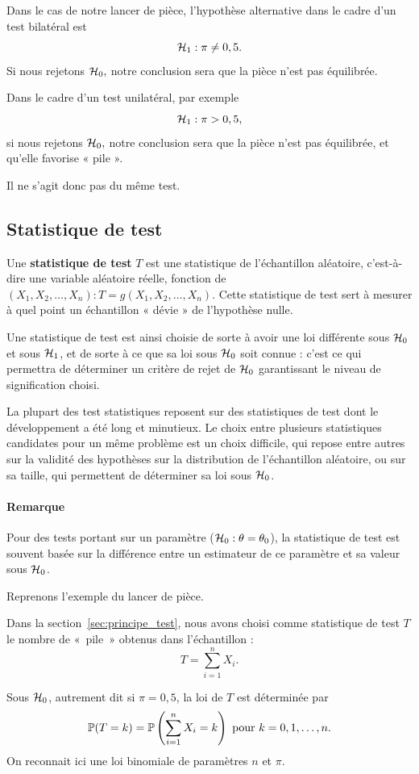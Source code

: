 \begin{exemple}
	Dans le cas de notre lancer de pièce, l'hypothèse alternative dans le cadre
	d'un test bilatéral est
	\[
	\mathcal{H}_1: \pi \neq 0,5.
	\]
	Si nous rejetons $\mathcal{H}_0,$ notre conclusion sera que la pièce n'est pas équilibrée.
	
	Dans le cadre d'un test unilatéral, par exemple
	\[
	\mathcal{H}_1: \pi > 0,5,
	\]
	si nous rejetons $\mathcal{H}_0,$ notre conclusion sera que la pièce n'est pas
	équilibrée, et qu'elle favorise « pile ».
	
	Il ne s'agit donc pas du même test.
\end{exemple}


\subsection{Statistique de test}
Une \textbf{statistique de test} $T$ est une statistique de l'échantillon
aléatoire, c'est-à-dire une variable aléatoire réelle, fonction de
$(X_1, X_2, \dots, X_n) : T = g(X_1, X_2, \dots, X_n)$. Cette statistique de
test sert à mesurer à quel point un échantillon « dévie » de l'hypothèse nulle.

Une statistique de test est ainsi choisie de sorte à avoir une loi différente
sous $\mathcal{H}_0$ et sous $\mathcal{H}_1$, et de sorte à ce que sa loi sous $\mathcal{H}_0$ soit
connue : c'est ce qui permettra de déterminer un critère de rejet de $\mathcal{H}_0$
garantissant le niveau de signification choisi.

La plupart des test statistiques reposent sur des statistiques de test dont le
développement a été long et minutieux. Le choix entre plusieurs statistiques
candidates pour un même problème est un choix difficile, qui repose entre
autres sur la validité des hypothèses sur la distribution de l'échantillon
aléatoire, ou sur sa taille, qui permettent de déterminer sa loi sous $\mathcal{H}_0$.

\paragraph{Remarque} Pour des tests portant sur un paramètre
($\mathcal{H}_0: \theta = \theta_0$), la statistique de test est souvent basée sur la
différence entre un estimateur de ce paramètre et sa valeur sous $\mathcal{H}_0$.

\begin{exemple}
	Reprenons l'exemple du lancer de pièce.
	
	Dans la section~\ref{sec:principe_test}, nous avons choisi comme statistique
	de test $T$ le nombre de «~pile~» obtenus dans l'échantillon :
	\[
	T = \sum_{i=1}^n X_i.
	\]
	
	Sous $\mathcal{H}_0$, autrement dit si $\pi=0,5$, la loi de $T$ est déterminée par 
	\[
	\mathbb{P}(T=k) = \mathbb{P}\left(\sum_{i=1}^n X_i = k\right) \text{ pour } k=0, 1,
	\dots, n.
	\]
	On reconnait ici une loi binomiale de paramètres $n$ et $\pi.$
\end{exemple}


